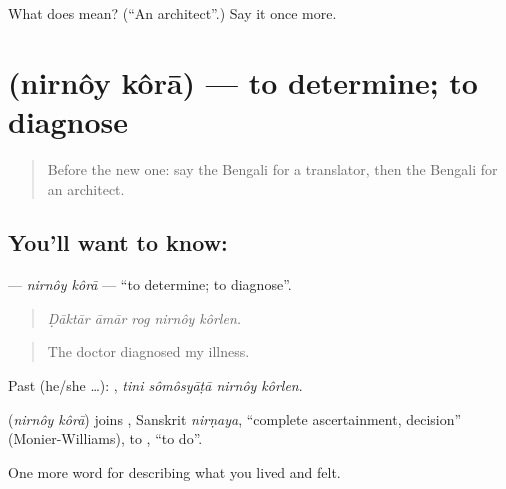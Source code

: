 \begin{tcolorbox}[breakable,colback=teal!4,colframe=teal!35!black,title={Before you move on}]
What does  mean? (\textquotedblleft{}An architect\textquotedblright{}.) Say it once more.
\end{tcolorbox}
\section[\texorpdfstring{\bn{নির্ণয়} \bn{করা} (nirnôy kôrā)}{নির্ণয় করা (nirnôy kôrā)}]{  (nirnôy kôrā) — to determine; to diagnose}

\label{lesson:BN-C501-nirnoy-kora}



\begin{quote}
Before the new one: say the Bengali for a translator, then the Bengali for an architect.
\end{quote}

\subsection*{You'll want to know:  }
\textbf{ } — \emph{nirnôy kôrā} — \textquotedblleft{}to determine; to diagnose\textquotedblright{}.

\begin{quote}
    
\end{quote}

\begin{quote}
\emph{Ḍāktār āmār rog nirnôy kôrlen.}
\end{quote}

\begin{quote}
The doctor diagnosed my illness.
\end{quote}

Past (he/she …):    , \emph{tini sômôsyāṭā nirnôy kôrlen}.

\begin{cousinweb}
\textbf{ } (\emph{nirnôy kôrā}) joins , Sanskrit \emph{nirṇaya}, \textquotedblleft{}complete ascertainment, decision\textquotedblright{} (Monier-Williams), to , \textquotedblleft{}to do\textquotedblright{}.
\end{cousinweb}

\begin{grammarlens}[title={What you've built}]
One more word for describing what you lived and felt.
\end{grammarlens}

